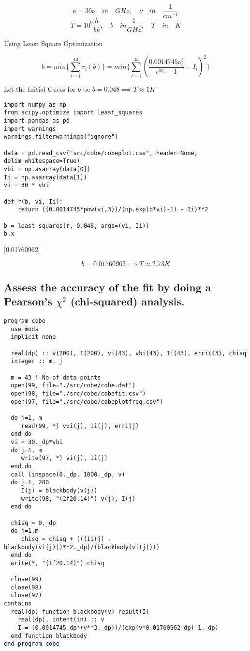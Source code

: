 \documentclass[a4paper,11pt,twoside]{article}
\begin{document}
$$
\nu = 30\widetilde{\nu}  \quad in \quad GHz, \quad
\widetilde{\nu} \quad in \quad \frac{1}{cm^{-1}}
$$
$$
T = 10^9 \frac{h}{bk}, \quad b \quad in \frac{1}{GHz}, \quad T \quad in \quad K
$$


\clearpage

Using Least Square Optimization

$$
b = min\{ \sum_{i=1}^{43} r_i(b) \} = min\{ \sum_{i=1}^{43} ( \frac{0.0014745 \nu_i^3}{e^{b\nu_i}-1} - I_i)^2 \}
$$

Let the Initial Guess for \(b\) be
\(b = 0.048  \implies T \approx 1K\)

\begin{verbatim}
import numpy as np
from scipy.optimize import least_squares
import pandas as pd
import warnings
warnings.filterwarnings("ignore")

data = pd.read_csv("src/cobe/cobeplot.csv", header=None, delim_whitespace=True)
vbi = np.asarray(data[0])
Ii = np.asarray(data[1])
vi = 30 * vbi

def r(b, vi, Ii):
    return ((0.0014745*pow(vi,3))/(np.exp(b*vi)-1) - Ii)**2

b = least_squares(r, 0.048, args=(vi, Ii))
b.x
\end{verbatim}

[0.01760962]


$$
b = 0.01760962  \implies T \approx 2.73K
$$


\subsection{Assess the accuracy of the fit by doing a Pearson's \(\chi^2\) (chi-squared) analysis.}
\label{sec:org43ae4db}


\begin{verbatim}
program cobe
  use mods
  implicit none

  real(dp) :: v(200), I(200), vi(43), vbi(43), Ii(43), erri(43), chisq
  integer :: m, j

  m = 43 ! No of data points
  open(99, file="./src/cobe/cobe.dat")
  open(98, file="./src/cobe/cobefit.csv")
  open(97, file="./src/cobe/cobeplotfreq.csv")

  do j=1, m
     read(99, *) vbi(j), Ii(j), erri(j)
  end do
  vi = 30._dp*vbi
  do j=1, m
     write(97, *) vi(j), Ii(j)
  end do
  call linspace(0._dp, 1000._dp, v)
  do j=1, 200
     I(j) = blackbody(v(j))
     write(98, "(2f20.14)") v(j), I(j)
  end do

  chisq = 0._dp
  do j=1,m
     chisq = chisq + (((Ii(j) - blackbody(vi(j)))**2._dp)/(blackbody(vi(j))))
  end do
  write(*, "(1f20.14)") chisq
  
  close(99)
  close(98)
  close(97)
contains
  real(dp) function blackbody(v) result(I)
    real(dp), intent(in) :: v
    I = (0.0014745_dp*(v**3._dp))/(exp(v*0.01760962_dp)-1._dp)
  end function blackbody
end program cobe
\end{verbatim}
\end{document}

